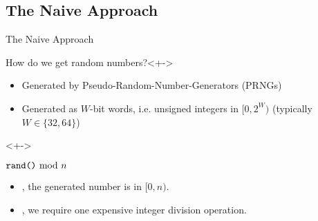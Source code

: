 \subsection{The Naive Approach}
\begin{frame}{The Naive Approach}
    \pause 
    \begin{block}{How do we get random numbers?}<+->
        \begin{itemize}[<+->]
            \item Generated by Pseudo-Random-Number-Generators (PRNGs)
            \item Generated as $W$-bit words, i.e. unsigned integers in $[0,2^W)$ (typically $W \in \{32,64\}$)
        \end{itemize}
    \end{block}

    \begin{exampleblock}{}<+->
        \begin{center}
            $\texttt{rand()} \ \mathrm{mod}\ n$
        \end{center}
    \end{exampleblock}

    \begin{itemize}[<+->]
        \item {}, the generated number is in $[0,n)$.
    \end{itemize}

    \begin{itemize}[<+->]
        \item {}, we require one expensive integer division operation.
    \end{itemize}

    \onslide<+->{Is the generated number uniform in $[0,n)$?}
\end{frame}

\iffalse
\begin{frame}{The Naive Approach}
    \begin{alertblock}{Is the generated number uniform in $\boldsymbol{[0,n)}$?}<+->
        \onslide<+->{Consider the case where $W = 4$ and $n = 3$.}
        \onslide<+->{Then, $[0,2^W)$ is}
        \onslide<+->{\begin{align*}
            0,1,2,3,4,5,6,7,8,9,10,11,12,13,14,15
        \end{align*}}
        \onslide<+->{Apply $\left(x \Mod 3\right)$ for every $x$ and get}
        \onslide<+->{\begin{align*}
            0,1,2,0,1,2,0,1,2,0,1,2,0,1,2,0
        \end{align*}}
        \onslide<+->{\GB{$0$} appears \ER{$6$} times, \GB{$1$} appears \ER{$5$} times, and \GB{$2$} appears \ER{$5$} times!}
    \end{alertblock}

\end{frame}
\fi

